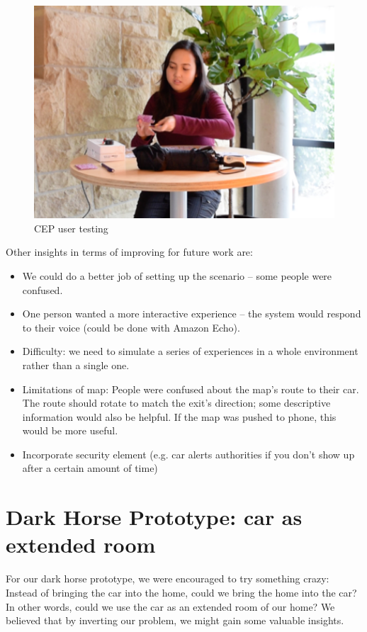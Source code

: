 \begin{figure}
\centering
\includegraphics[width=5in]{Figures/Prototypes/CEP/CEPtest2.png}
	\caption{CEP user testing}
		\label{fig:CEPtest2}
\end{figure}

Other insights in terms of improving for future work are:

\begin{itemize}
    \item We could do a better job of setting up the scenario – some people were confused. 
    \item One person wanted a more interactive experience – the system would respond to their voice (could be done with Amazon Echo).
    \item Difficulty: we need to simulate a series of experiences in a whole environment rather than a single one. 
    \item Limitations of map: People were confused about the map’s route to their car. The route should rotate to match the exit’s direction; some descriptive information would also be helpful. If the map was pushed to phone, this would be more useful.
    \item Incorporate security element (e.g. car alerts authorities if you don’t show up after a certain amount of time)
\end{itemize}


\section{Dark Horse Prototype: car as extended room}

For our dark horse prototype, we were encouraged to try something crazy: Instead of bringing the car into the home, could we bring the home into the car? In other words, could we use the car as an extended room of our home? We believed that by inverting our problem, we might gain some valuable insights.

